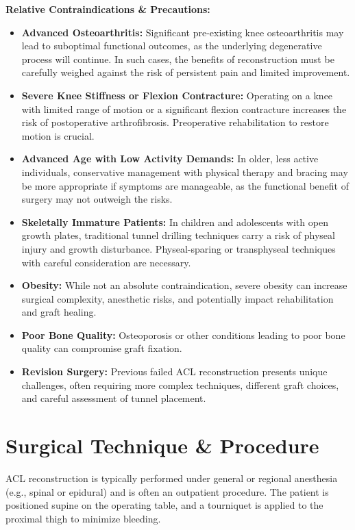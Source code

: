 \textbf{Relative Contraindications \& Precautions:}
\begin{itemize}
  \item \textbf{Advanced Osteoarthritis:} Significant pre-existing knee osteoarthritis may lead to suboptimal functional outcomes, as the underlying degenerative process will continue. In such cases, the benefits of reconstruction must be carefully weighed against the risk of persistent pain and limited improvement.
  
  \item \textbf{Severe Knee Stiffness or Flexion Contracture:} Operating on a knee with limited range of motion or a significant flexion contracture increases the risk of postoperative arthrofibrosis. Preoperative rehabilitation to restore motion is crucial.
  
  \item \textbf{Advanced Age with Low Activity Demands:} In older, less active individuals, conservative management with physical therapy and bracing may be more appropriate if symptoms are manageable, as the functional benefit of surgery may not outweigh the risks.
  
  \item \textbf{Skeletally Immature Patients:} In children and adolescents with open growth plates, traditional tunnel drilling techniques carry a risk of physeal injury and growth disturbance. Physeal-sparing or transphyseal techniques with careful consideration are necessary.
  
  \item \textbf{Obesity:} While not an absolute contraindication, severe obesity can increase surgical complexity, anesthetic risks, and potentially impact rehabilitation and graft healing.
  
  \item \textbf{Poor Bone Quality:} Osteoporosis or other conditions leading to poor bone quality can compromise graft fixation.
  
  \item \textbf{Revision Surgery:} Previous failed ACL reconstruction presents unique challenges, often requiring more complex techniques, different graft choices, and careful assessment of tunnel placement.
\end{itemize}

\section*{Surgical Technique \& Procedure}
ACL reconstruction is typically performed under general or regional anesthesia (e.g., spinal or epidural) and is often an outpatient procedure. The patient is positioned supine on the operating table, and a tourniquet is applied to the proximal thigh to minimize bleeding.

